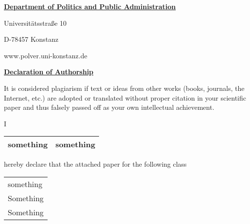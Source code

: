 {
\setlength{\parindent}{0cm}
\myhelvetica

\thispagestyle{page1}

{\raggedleft\small

\textbf{\ul{Department of Politics and Public Administration}}

\scriptsize
\vspace{0.4cm}

Universitätsstraße 10

D-78457 Konstanz

\vspace{0.2cm}

www.polver.uni-konstanz.de
}

\vspace{0.25cm}

{\large{\textbf{\ul{Declaration of Authorship}}}}

\raggedright
\vspace{0.5cm}

It is considered plagiarism if text or ideas from other works (books, journals, the Internet, etc.) are adopted or translated without proper citation in your scientific paper and thus falsely passed off as your own intellectual achievement.

\vspace{0.25cm}

\begin{minipage}{0.05\textwidth}
    I
\end{minipage}\begin{minipage}{0.95\textwidth}
        \begin{tabularx}{\textwidth}{X|X|}
            \hline
        something & something\\
        \hline
        \end{tabularx}

\end{minipage}

\vspace{0.2cm}

hereby declare that the attached paper for the following class

\vspace{-0.25cm}

\begin{center}
\begin{tabularx}{0.975\textwidth}{|X|}
    \hline
    something\\
    Something\\
    Something\\
    \hline
\end{tabularx}
\end{center}


}
